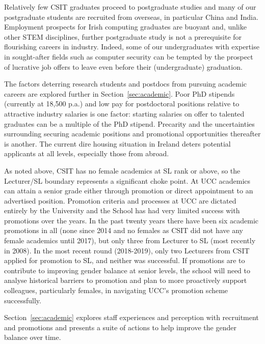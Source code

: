 Relatively few CSIT graduates proceed to postgraduate studies and 
many of our postgraduate students are  recruited from overseas, in particular China and India.
Employment prospects for Irish computing graduates are buoyant and, 
unlike other STEM disciplines, further postgraduate study is not a 
prerequisite for flourishing careers in  industry. Indeed, some of our 
undergraduates with expertise in sought-after fields such as computer 
security can be tempted by the prospect of lucrative 
job offers to leave even before their (undergraduate)
graduation.

The factors deterring research students and postdocs from pursuing 
academic careers are explored further in 
Section~\ref{sec:academic}. 
Poor PhD stipends (currently at \texteuro{}18,500 p.a.) and low
pay for postdoctoral positions relative to attractive industry salaries 
is one factor: starting salaries on offer to talented 
graduates can be a multiple of the PhD stipend. 
Precarity and the uncertainties surrounding  securing academic 
positions and promotional opportunities thereafter is another. 
The current dire housing situation in Ireland deters potential 
applicants at all levels, especially those from abroad.


As noted above, CSIT has no female academics at \ac{SL}
rank or above, so the Lecturer/SL boundary represents
a significant choke point.
At UCC academics can attain a senior grade 
either through promotion or direct appointment to an advertised 
position. Promotion criteria and processes at UCC are 
dictated entirely 
by the University and the School has had very limited success with 
promotions over the years.
In the past twenty years there have been six academic
promotions in all (none since 2014 and no females as CSIT did not have any female academics until 2017), 
but only three from Lecturer to 
SL (most recently in 2008).
In the most recent round (2018-2019), only two 
Lecturers from CSIT applied for promotion to SL, and neither was successful.  
If promotions are to contribute to improving gender balance at senior 
levels, the school will need to analyse historical barriers to promotion
and plan to more  proactively support colleagues, particularly
females, in navigating UCC's promotion scheme successfully. 

Section~\ref{sec:academic} explores staff experiences
and perception with recruitment and  promotions and presents a suite of actions to help improve the gender balance over time.




